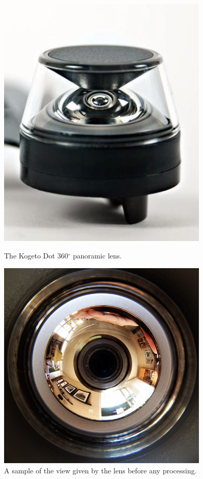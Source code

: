 \documentclass[a4paper,12pt,twoside,openright]{article}
\begin{document}
\begin{figure}[t!]
  \centering
  \begin{minipage}[t!]{0.45\textwidth}
    \centering
    \includegraphics[width=0.9\textwidth]{KogetoDot}
    \caption{The Kogeto Dot 360$^\circ$ panoramic lens.}
  \end{minipage}
  \hfill
  \begin{minipage}[t!]{0.45\textwidth}
    \centering
    \includegraphics[width=0.9\textwidth]{PanoramicView}
    \caption{A sample of the view given by the lens before any processing.}
  \end{minipage}

\end{figure}
\end{document}
